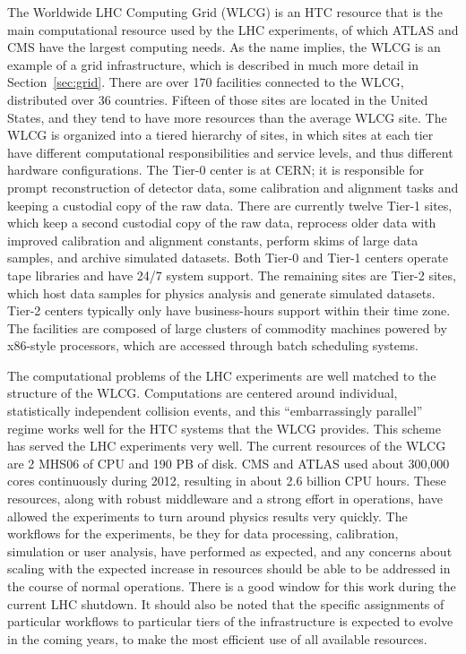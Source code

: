 The Worldwide LHC Computing Grid (WLCG) is an HTC resource that is the main computational resource used by the LHC experiments, of which ATLAS and CMS have the largest computing needs.  As the name implies, the WLCG is an example of a grid infrastructure, which is described in much more detail in Section~\ref{sec:grid}.  There are over 170 facilities connected to the WLCG, distributed over 36 countries.  Fifteen of those sites are located in the United States, and they tend to have more resources than the average WLCG site.  The WLCG is organized into a tiered hierarchy of sites, in which sites at each tier have different computational responsibilities and service levels, and thus different hardware configurations.  The Tier-0 center is at CERN; it is responsible for prompt reconstruction of detector data, some calibration and alignment tasks and keeping a custodial copy of the raw data.  There are currently twelve Tier-1 sites, which keep a second custodial copy of the raw data, reprocess older data with improved calibration and alignment constants, perform skims of large data samples, and archive simulated datasets.  Both Tier-0 and Tier-1 centers operate tape libraries and have 24/7 system support.  The remaining sites are Tier-2 sites, which host data samples for physics analysis and generate simulated datasets.  Tier-2 centers typically only have business-hours support within their time zone.  The facilities are composed of large clusters of commodity machines powered by x86-style processors, which are accessed through batch scheduling systems.

The computational problems of the LHC experiments are well matched to the structure of the WLCG.  Computations are centered around individual, statistically independent collision events, and this “embarrassingly parallel” regime works well for the HTC systems that the WLCG provides.  This scheme has served the LHC experiments very well.  The current resources of the WLCG are 2 MHS06 of CPU and 190 PB of disk.  CMS and ATLAS used about 300,000 cores continuously during 2012, resulting in about 2.6 billion CPU hours.  These resources, along with robust middleware and a strong effort in operations, have allowed the experiments to turn around physics results very quickly.  The workflows for the experiments, be they for data processing, calibration, simulation or user analysis, have performed as expected, and any concerns about scaling with the expected increase in resources should be able to be addressed in the course of normal operations.  There is a good window for this work during the current LHC shutdown.  It should also be noted that the specific assignments of particular workflows to particular tiers of the infrastructure is expected to evolve in the coming years, to make the most efficient use of all available resources.

